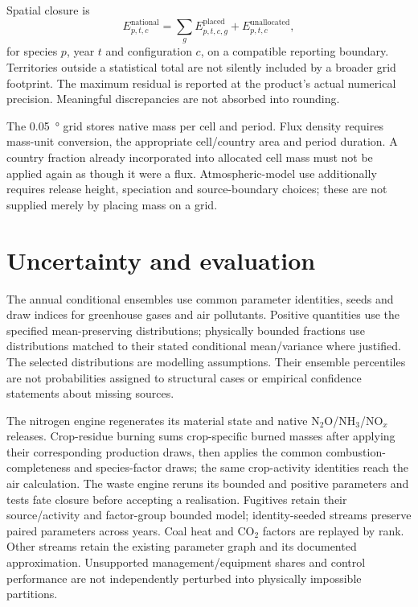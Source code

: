 \documentclass[essd]{copernicus}
\begin{document}
Spatial closure is
\begin{equation}
 E_{p,t,c}^{\mathrm{national}}=\sum_g E_{p,t,c,g}^{\mathrm{placed}}
                      +E_{p,t,c}^{\mathrm{unallocated}},
 \label{eq:spatial}
\end{equation}
for species $p$, year $t$ and configuration $c$, on a compatible reporting boundary. Territories outside a statistical total are not silently included by a broader grid footprint. The maximum residual is reported at the product's actual numerical precision. Meaningful discrepancies are not absorbed into rounding.

The \SI{0.05}{\degree} grid stores native mass per cell and period. Flux density requires mass-unit conversion, the appropriate cell/country area and period duration. A country fraction already incorporated into allocated cell mass must not be applied again as though it were a flux. Atmospheric-model use additionally requires release height, speciation and source-boundary choices; these are not supplied merely by placing mass on a grid.

\section{Uncertainty and evaluation}
The annual conditional ensembles use common parameter identities, seeds and draw indices for greenhouse gases and air pollutants. Positive quantities use the specified mean-preserving distributions; physically bounded fractions use distributions matched to their stated conditional mean/variance where justified. The selected distributions are modelling assumptions. Their ensemble percentiles are not probabilities assigned to structural cases or empirical confidence statements about missing sources.

The nitrogen engine regenerates its material state and native N$_2$O/NH$_3$/NO$_x$ releases. Crop-residue burning sums crop-specific burned masses after applying their corresponding production draws, then applies the common combustion-completeness and species-factor draws; the same crop-activity identities reach the air calculation. The waste engine reruns its bounded and positive parameters and tests fate closure before accepting a realisation. Fugitives retain their source/activity and factor-group bounded model; identity-seeded streams preserve paired parameters across years. Coal heat and CO$_2$ factors are replayed by rank. Other streams retain the existing parameter graph and its documented approximation. Unsupported management/equipment shares and control performance are not independently perturbed into physically impossible partitions.
\end{document}
